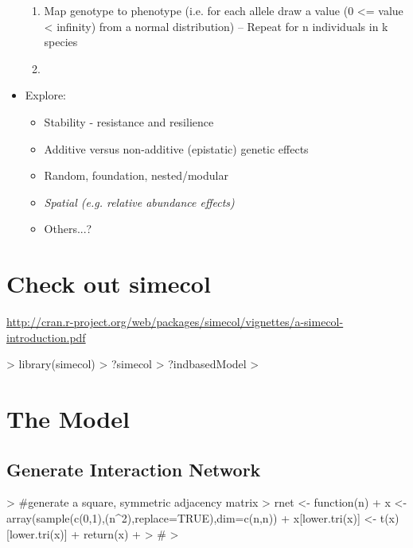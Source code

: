 \documentclass[12pt]{article}
\begin{document}
\begin{itemize}
\begin{enumerate}
  \item Map genotype to phenotype (i.e. for each allele draw a value
    (0 <= value < infinity) from a normal distribution)
    \subitem -- Repeat for n individuals in k species
  \item 
  \end{enumerate}
\item Explore:
  \begin{itemize}
  \item Stability - resistance and resilience 
  \item Additive versus non-additive (epistatic) genetic effects
  \item Random, foundation, nested/modular
  \item \textit{Spatial (e.g. relative abundance effects)}
  \item Others...?
  \end{itemize}
\end{itemize}

\section{Check out simecol}
\url{http://cran.r-project.org/web/packages/simecol/vignettes/a-simecol-introduction.pdf}

\begin{Schunk}
\begin{Sinput}
> library(simecol)
> ?simecol
> ?indbasedModel
> 
\end{Sinput}
\end{Schunk}

\section{The Model}

\subsection{Generate Interaction Network}

\begin{Schunk}
\begin{Sinput}
>                                         #generate a square, symmetric adjacency matrix 
> rnet <- function(n){
+ x <- array(sample(c(0,1),(n^2),replace=TRUE),dim=c(n,n))
+ x[lower.tri(x)] <- t(x)[lower.tri(x)]
+ return(x)
+ }
>                                         #
> 
\end{Sinput}
\end{Schunk}
\end{document}

